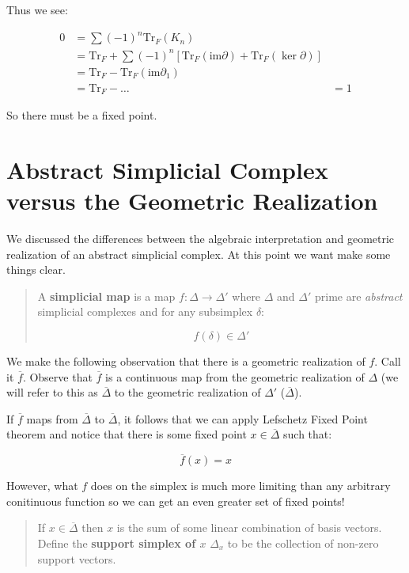 \documentclass[letterpaper,12pt]{article}
\newcommand{\Tr}{\text{Tr}}
\newcommand{\im}{\text{im}}
\newcommand{\ol}{\overline}
\begin{document}
Thus we see:

\begin{align}
    0 &= \sum (-1)^{n} \Tr_F(K_n) \\
      &= \Tr_F + \sum (-1)^{n} [\Tr_F(\im \partial) + \Tr_F(\ker \partial)] \\
      &= \Tr_F - \Tr_F(\im \partial_1) \\
      &= \Tr_F - \ldots
      &= 1
\end{align}

So there must be a fixed point.

\section{Abstract Simplicial Complex versus the Geometric Realization}

We discussed the differences between the algebraic interpretation and geometric realization of an abstract simplicial complex. At this point we want make some things clear.

\begin{quote}
    A \textbf{simplicial map} is a map $f : \Delta \to \Delta'$ where $\Delta$ and $\Delta'$ prime are \textit{abstract} simplicial complexes and for any subsimplex $\delta$:

    $$f(\delta) \in \Delta'$$
\end{quote}

We make the following observation that there is a geometric realization of $f$. Call it $\ol{f}$. Observe that $\ol{f}$ is a continuous map from the geometric realization of $\Delta$ (we will refer to this as $\ol{\Delta}$ to the geometric realization of $\Delta'$ ($\ol{\Delta}$).

If $\ol{f}$ maps from $\ol{\Delta}$ to $\ol{\Delta}$, it follows that we can apply Lefschetz Fixed Point theorem and notice that there is some fixed point $x \in \ol{\Delta}$ such that:

$$\ol{f}(x) = x$$

However, what $f$ does on the simplex is much more limiting than any arbitrary conitinuous function so we can get an even greater set of fixed points!

\begin{quote}
    If $x \in \ol{\Delta}$ then $x$ is the sum of some linear combination of basis vectors. Define the \textbf{support simplex of $x$} $\Delta_x$ to be the collection of non-zero support vectors.
\end{quote}
\end{document}
